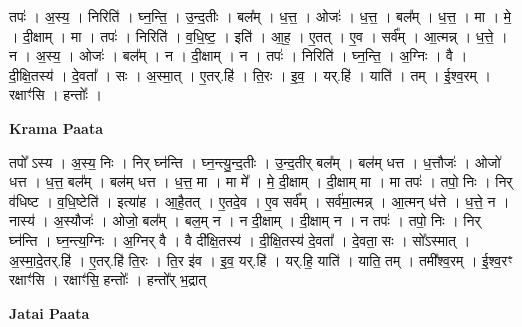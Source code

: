 \documentclass[17pt]{extarticle}
\begin{document}
तपः॑ । अ॒स्य॒ । निरिति॑ । घ्न॒न्ति॒ । उ॒न्द॒तीः । बल᳚म् । ध॒त्त॒ । ओजः॑ । ध॒त्त॒ । बल᳚म् । ध॒त्त॒ । मा । मे॒ । दी॒क्षाम् । मा । तपः॑ । निरिति॑ । व॒धि॒ष्ट॒ । इति॑ । आ॒ह॒ । ए॒तत् । ए॒व । सर्व᳚म् । आ॒त्मन्न् । ध॒त्ते॒ । न । अ॒स्य॒ । ओजः॑ । बल᳚म् । न । दी॒क्षाम् । न । तपः॑ । निरिति॑ । घ्न॒न्ति॒ । अ॒ग्निः । वै । दी॒क्षि॒तस्य॑ । दे॒वता᳚ । सः । अ॒स्मा॒त् । ए॒तर्.हि॑ । ति॒रः । इ॒व॒ । यर्.हि॑ । याति॑ । तम् । ई॒श्व॒रम् । रक्षाꣳ॑सि । हन्तोः᳚ ।  \newline


\textbf{Krama Paata} \newline

तपो᳚ ऽस्य । अ॒स्य॒ निः । निर् घ्न॑न्ति । घ्न॒न्त्यु॒न्द॒तीः । उ॒न्द॒तीर् बल᳚म् । बल॑म् धत्त । ध॒त्तौजः॑ । ओजो॑ धत्त । ध॒त्त॒ बल᳚म् । बल॑म् धत्त । ध॒त्त॒ मा । मा मे᳚ । मे॒ दी॒क्षाम् । दी॒क्षाम् मा । मा तपः॑ । तपो॒ निः । निर् व॑धिष्ट । व॒धि॒ष्टेति॑ । इत्या॑ह । आ॒है॒तत् । ए॒तदे॒व । ए॒व सर्व᳚म् । सर्व॑मा॒त्मन्न् । आ॒त्मन् ध॑त्ते । ध॒त्ते॒ न । नास्य॑ । अ॒स्यौजः॑ । ओजो॒ बल᳚म् । बल॒म् न । न दी॒क्षाम् । दी॒क्षाम् न । न तपः॑ । तपो॒ निः । निर् घ्न॑न्ति । घ्न॒न्त्य॒ग्निः । अ॒ग्निर् वै । वै दी᳚क्षि॒तस्य॑ । दी॒क्षि॒तस्य॑ दे॒वता᳚ । दे॒वता॒ सः । सो᳚ऽस्मात् । अ॒स्मा॒दे॒तर्.हि॑ । ए॒तर्.हि॑ ति॒रः । ति॒र इ॑व । इ॒व॒ यर्.हि॑ । यर्.हि॒ याति॑ । याति॒ तम् । तमी᳚श्व॒रम् । ई॒श्व॒रꣳ रक्षाꣳ॑सि । रक्षाꣳ॑सि॒ हन्तोः᳚ । हन्तो᳚र् भ॒द्रात् \newline

\textbf{Jatai Paata} \newline
\end{document}
